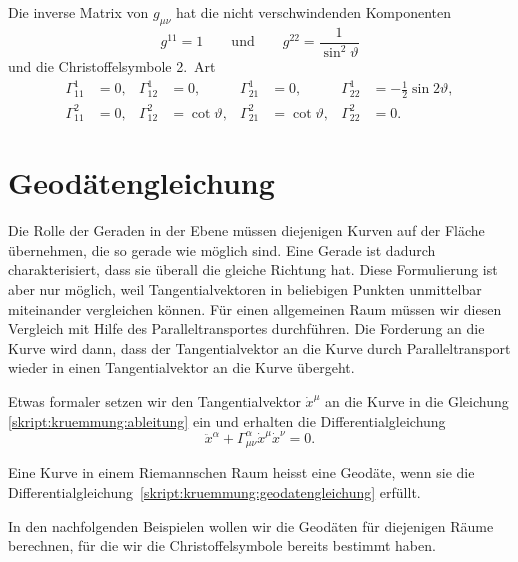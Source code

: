 Die inverse Matrix von $g_{\mu\nu}$ hat die nicht verschwindenden
Komponenten
\[
g^{11} = 1
\qquad\text{und}\qquad
g^{22} = \frac1{\sin^2\vartheta}
\]
und die Christoffelsymbole 2.~Art
\begin{equation}
\begin{aligned}
 \Gamma_{11}^1
&=0,
&\Gamma_{12}^1
&=0,
&\Gamma_{21}^1
&=0,
&\Gamma_{22}^1
&=-\frac12\sin2\vartheta,
\\
 \Gamma_{11}^2
&=0,
&\Gamma_{12}^2
&=\cot\vartheta,
&\Gamma_{21}^2
&=\cot\vartheta,
&\Gamma_{22}^2
&=0.
\end{aligned}
\label{skript:kruemmung:christoffelkugel}
\end{equation}


\section{Geodätengleichung}
Die Rolle der Geraden in der Ebene müssen diejenigen Kurven auf der
Fläche übernehmen, die so gerade wie möglich sind. 
Eine Gerade ist dadurch charakterisiert, dass sie überall die gleiche
Richtung hat. 
Diese Formulierung ist aber nur möglich, weil Tangentialvektoren in
beliebigen Punkten unmittelbar miteinander vergleichen können.
Für einen allgemeinen Raum müssen wir diesen Vergleich mit Hilfe
des Paralleltransportes durchführen.
Die Forderung an die Kurve wird dann, dass der Tangentialvektor
an die Kurve durch Paralleltransport wieder in einen Tangentialvektor
an die Kurve übergeht.

Etwas formaler setzen wir den Tangentialvektor $\dot x^\mu$ an die
Kurve in die Gleichung \eqref{skript:kruemmung:ableitung} ein und
erhalten die Differentialgleichung 
\begin{equation}
\ddot x^\alpha+\Gamma_{\mu\nu}^\alpha \dot x^\mu\dot x^\nu=0.
\label{skript:kruemmung:geodatengleichung}
\end{equation}
%

\begin{definition}
Eine Kurve in einem Riemannschen Raum heisst eine Geodäte, wenn sie
die Differentialgleichung~\eqref{skript:kruemmung:geodatengleichung}
erfüllt.
\end{definition}

In den nachfolgenden Beispielen wollen wir die Geodäten für diejenigen
Räume berechnen, für die wir die Christoffelsymbole bereits bestimmt
haben.

%
%

